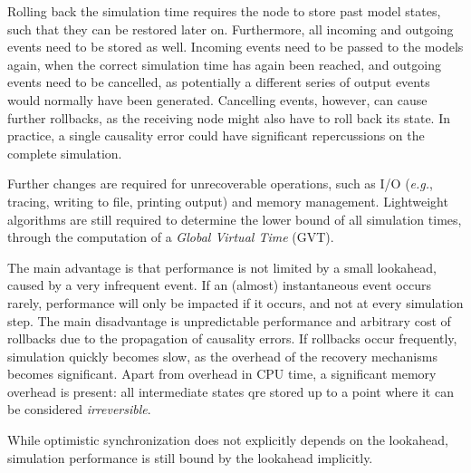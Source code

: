Rolling back the simulation time requires the node to store past model states, such that they can be restored later on.
Furthermore, all incoming and outgoing events need to be stored as well.
Incoming events need to be passed to the models again, when the correct simulation time has again been reached, and outgoing events need to be cancelled, as potentially a different series of output events would normally have been generated.
Cancelling events, however, can cause further rollbacks, as the receiving node might also have to roll back its state.
In practice, a single causality error could have significant repercussions on the complete simulation.

Further changes are required for unrecoverable operations, such as I/O (\textit{e.g.}, tracing, writing to file, printing output) and memory management.
Lightweight algorithms are still required to determine the lower bound of all simulation times, through the computation of a \textit{Global Virtual Time} (GVT).

The main advantage is that performance is not limited by a small lookahead, caused by a very infrequent event.
If an (almost) instantaneous event occurs rarely, performance will only be impacted if it occurs, and not at every simulation step.
The main disadvantage is unpredictable performance and arbitrary cost of rollbacks due to the propagation of causality errors.
If rollbacks occur frequently, simulation quickly becomes slow, as the overhead of the recovery mechanisms becomes significant.
Apart from overhead in CPU time, a significant memory overhead is present: all intermediate states qre stored up to a point where it can be considered \textit{irreversible}.

While optimistic synchronization does not explicitly depends on the lookahead, simulation performance is still bound by the lookahead implicitly.
